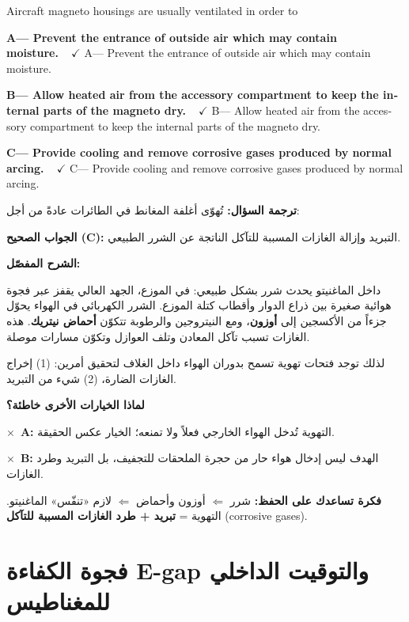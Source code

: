 \documentclass[11pt,a4paper]{article}
\newcommand{\en}[1]{\textenglish{#1}}
\newcommand{\correctletter}{}
\newcommand{\opt}[2]{%
  \ifdefstring{\correctletter}{#1}%
    {\textcolor{ansgreen}{\textbf{#1— #2\ \ $\checkmark$}}}%
    {#1— #2}\par}
\newcommand{\Q}[6]{%
  \renewcommand{\correctletter}{#6}%
  \par\bigskip
  \phantomsection\label{q#1}%
  \begin{tcolorbox}[enhanced,breakable,colback=qback,colframe=qframe,
      arc=2mm,boxrule=0.8pt,fonttitle=\bfseries,
      title={\en{Question #1}}]
    \begin{english}
      #2\par\smallskip
      \opt{A}{#3}\opt{B}{#4}\opt{C}{#5}
    \end{english}
  \end{tcolorbox}}
\newcommand{\tr}[1]{\textbf{\textcolor{qframe}{ترجمة السؤال:}} #1\par}
\newcommand{\ans}[2]{%
  \begin{tcolorbox}[colback=ansback,colframe=ansgreen,boxrule=0.6pt,arc=1.5mm,
      left=4pt,right=4pt,top=2pt,bottom=2pt]
    \textbf{\textcolor{ansgreen}{الجواب الصحيح (\en{#1}):}} #2
  \end{tcolorbox}}
\newcommand{\sharh}[1]{\textbf{\textcolor{conceptc}{الشرح المفصّل:}}\par #1\par}
\newcommand{\nohead}{\textbf{\textcolor{wrongc}{لماذا الخيارات الأخرى خاطئة؟}}\par}
\newcommand{\no}[2]{\hspace*{1em}\textcolor{wrongc}{$\times$}\ \textbf{\en{#1}:} #2\par}
\newcommand{\tip}[1]{%
  \begin{tcolorbox}[colback=tipback,colframe=tipframe,boxrule=0.5pt,arc=1.5mm,
      left=4pt,right=4pt,top=2pt,bottom=2pt]
    \textbf{فكرة تساعدك على الحفظ:} #1
  \end{tcolorbox}}
\begin{document}
\Q{8533}{Aircraft magneto housings are usually ventilated in order to}
{Prevent the entrance of outside air which may contain moisture.}
{Allow heated air from the accessory compartment to keep the internal parts of the magneto dry.}
{Provide cooling and remove corrosive gases produced by normal arcing.}{C}
\tr{تُهوّى أغلفة المغانط في الطائرات عادةً من أجل:}
\ans{C}{التبريد وإزالة الغازات المسببة للتآكل الناتجة عن الشرر الطبيعي.}
\sharh{داخل الماغنيتو يحدث شرر بشكل طبيعي: في الموزع، الجهد العالي يقفز عبر فجوة هوائية صغيرة بين ذراع الدوار وأقطاب كتلة الموزع. الشرر الكهربائي في الهواء يحوّل جزءاً من الأكسجين إلى \textbf{أوزون}، ومع النيتروجين والرطوبة تتكوّن \textbf{أحماض نيتريك}. هذه الغازات تسبب تآكل المعادن وتلف العوازل وتكوّن مسارات موصلة.

لذلك توجد فتحات تهوية تسمح بدوران الهواء داخل الغلاف لتحقيق أمرين: (1) إخراج الغازات الضارة، (2) شيء من التبريد.}
\nohead
\no{A}{التهوية تُدخل الهواء الخارجي فعلاً ولا تمنعه؛ الخيار عكس الحقيقة.}
\no{B}{الهدف ليس إدخال هواء حار من حجرة الملحقات للتجفيف، بل التبريد وطرد الغازات.}
\tip{شرر $\Leftarrow$ أوزون وأحماض $\Leftarrow$ لازم «تنفّس» الماغنيتو. التهوية = \textbf{تبريد + طرد الغازات المسببة للتآكل} (\en{corrosive gases}).}

\newpage
\section{فجوة الكفاءة \en{E-gap} والتوقيت الداخلي للمغناطيس}
\end{document}
